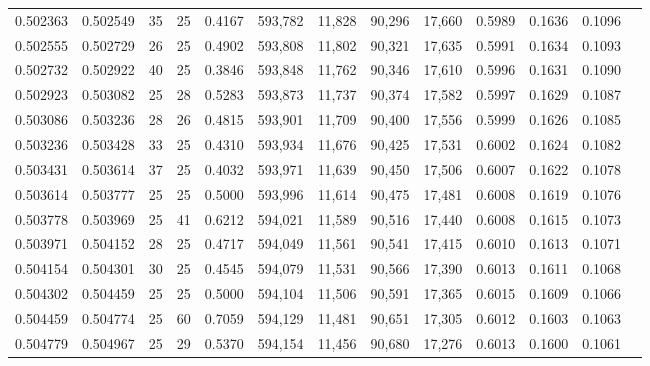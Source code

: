 \begin{tabular}{rrrrrrrrrrrrr}
0.502363 & 0.502549 &    35 &  25 &                                     0.4167 & 593,782 &  11,828 &  90,296 &  17,660 & 0.5989 & 0.1636 & 0.1096 \\
0.502555 & 0.502729 &    26 &  25 &                                     0.4902 & 593,808 &  11,802 &  90,321 &  17,635 & 0.5991 & 0.1634 & 0.1093 \\
0.502732 & 0.502922 &    40 &  25 &                                     0.3846 & 593,848 &  11,762 &  90,346 &  17,610 & 0.5996 & 0.1631 & 0.1090 \\
0.502923 & 0.503082 &    25 &  28 &                                     0.5283 & 593,873 &  11,737 &  90,374 &  17,582 & 0.5997 & 0.1629 & 0.1087 \\
0.503086 & 0.503236 &    28 &  26 &                                     0.4815 & 593,901 &  11,709 &  90,400 &  17,556 & 0.5999 & 0.1626 & 0.1085 \\
0.503236 & 0.503428 &    33 &  25 &                                     0.4310 & 593,934 &  11,676 &  90,425 &  17,531 & 0.6002 & 0.1624 & 0.1082 \\
0.503431 & 0.503614 &    37 &  25 &                                     0.4032 & 593,971 &  11,639 &  90,450 &  17,506 & 0.6007 & 0.1622 & 0.1078 \\
0.503614 & 0.503777 &    25 &  25 &                                     0.5000 & 593,996 &  11,614 &  90,475 &  17,481 & 0.6008 & 0.1619 & 0.1076 \\
0.503778 & 0.503969 &    25 &  41 &                                     0.6212 & 594,021 &  11,589 &  90,516 &  17,440 & 0.6008 & 0.1615 & 0.1073 \\
0.503971 & 0.504152 &    28 &  25 &                                     0.4717 & 594,049 &  11,561 &  90,541 &  17,415 & 0.6010 & 0.1613 & 0.1071 \\
0.504154 & 0.504301 &    30 &  25 &                                     0.4545 & 594,079 &  11,531 &  90,566 &  17,390 & 0.6013 & 0.1611 & 0.1068 \\
0.504302 & 0.504459 &    25 &  25 &                                     0.5000 & 594,104 &  11,506 &  90,591 &  17,365 & 0.6015 & 0.1609 & 0.1066 \\
0.504459 & 0.504774 &    25 &  60 &                                     0.7059 & 594,129 &  11,481 &  90,651 &  17,305 & 0.6012 & 0.1603 & 0.1063 \\
0.504779 & 0.504967 &    25 &  29 &                                     0.5370 & 594,154 &  11,456 &  90,680 &  17,276 & 0.6013 & 0.1600 & 0.1061 \\

\end{tabular}
